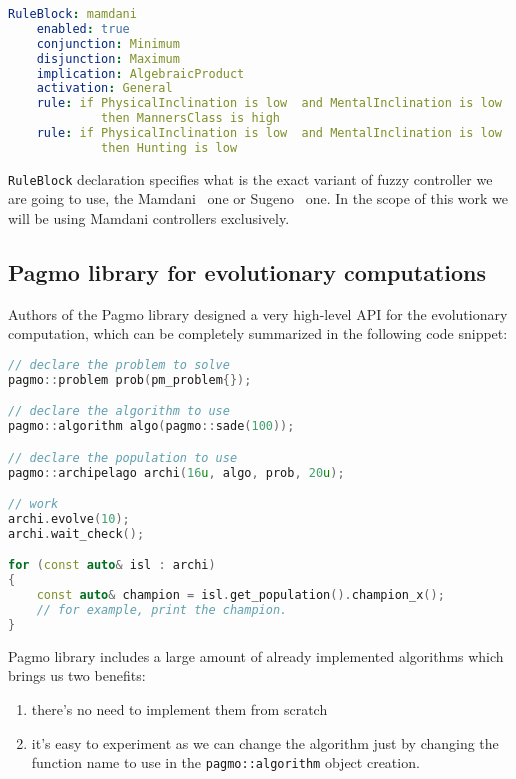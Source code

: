 \documentclass[12pt, a4paper]{article}
\begin{document}
  \begin{lstlisting}[language=yaml]
  RuleBlock: mamdani
    enabled: true
    conjunction: Minimum
    disjunction: Maximum
    implication: AlgebraicProduct
    activation: General
    rule: if PhysicalInclination is low  and MentalInclination is low
    	     then MannersClass is high
    rule: if PhysicalInclination is low  and MentalInclination is low 
    	     then Hunting is low
  \end{lstlisting}

	
  \texttt{RuleBlock} declaration specifies what is the exact variant of fuzzy controller we are going to use, the Mamdani~\cite{fuzzy::Mamdani} one or Sugeno~\cite{fuzzy::Sugeno} one.
  In the scope of this work we will be using Mamdani controllers exclusively.

	\subsection{Pagmo library for evolutionary computations}

	Authors of the Pagmo library designed a very high-level API for the evolutionary computation, which can be completely summarized in the following code snippet:
	
	\begin{lstlisting}[language=c++]
// declare the problem to solve
pagmo::problem prob(pm_problem{});

// declare the algorithm to use
pagmo::algorithm algo(pagmo::sade(100));

// declare the population to use
pagmo::archipelago archi(16u, algo, prob, 20u);

// work
archi.evolve(10);
archi.wait_check();

for (const auto& isl : archi)
{
	const auto& champion = isl.get_population().champion_x();
	// for example, print the champion.
}
	\end{lstlisting}

	Pagmo library includes a large amount of already implemented algorithms which brings us two benefits:
	
	\begin{enumerate}
		\item there's no need to implement them from scratch
		\item it's easy to experiment as we can change the algorithm just by changing the function name to use in the \texttt{pagmo::algorithm} object creation.
	\end{enumerate}
	
\end{document}
